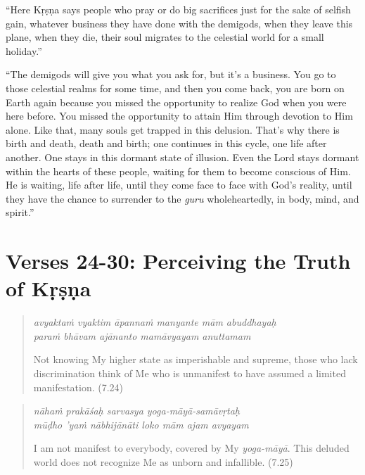 \documentclass[12pt, twoside, openright]{memoir}
\begin{document}
\enquote{Here Kṛṣṇa says people who pray or do big sacrifices just for the sake of selfish gain, whatever business they have done with the demigods, when they leave this plane, when they die, their soul migrates to the celestial world for a small holiday.}

\enquote{The demigods will give you what you ask for, but it’s a business. You go to those celestial realms for some time, and then you come back, you are born on Earth again because you missed the opportunity to realize God when you were here before. You missed the opportunity to attain Him through devotion to Him alone. Like that, many souls get trapped in this delusion. That’s why there is birth and death, death and birth; one continues in this cycle, one life after another. One stays in this dormant state of illusion. Even the Lord stays dormant within the hearts of these people, waiting for them to become conscious of Him. He is waiting, life after life, until they come face to face with God’s reality, until they have the chance to surrender to the \textit{guru} wholeheartedly, in body, mind, and spirit.}

\section{Verses 24-30: Perceiving the Truth of Kṛṣṇa}\label{sec-verses-24-30-perceiving-the-truth-of-krsna}


\par
\begin{verse}
\textit{avyaktaṁ vyaktim āpannaṁ manyante mām abuddhayaḥ} \\
\textit{paraṁ bhāvam ajānanto mamāvyayam anuttamam}

\noindent Not knowing My higher state as imperishable and supreme, those who lack discrimination think of Me who is unmanifest to have assumed a limited manifestation. (7.24)
\end{verse}
\par



\par
\begin{verse}
\textit{nāhaṁ prakāśaḥ sarvasya yoga-māyā-samāvṛtaḥ} \\
\textit{mūḍho ’yaṁ nābhijānāti loko mām ajam avyayam}

\noindent I am not manifest to everybody, covered by My \textit{yoga-māyā}. This deluded world does not recognize Me as unborn and infallible. (7.25)
\end{verse}
\par
\end{document}
